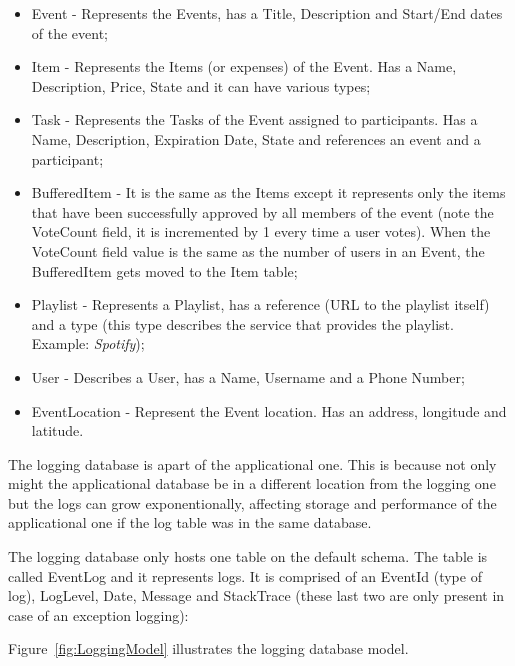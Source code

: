 \begin{itemize}
	\item Event - Represents the Events, has a Title, Description and Start/End dates of the event;
	
	\item Item - Represents the Items (or expenses) of the Event. Has a Name, Description, Price, State and it can have various types;
	
	\item Task - Represents the Tasks of the Event assigned to participants. Has a Name, Description, Expiration Date, State and references an event and a participant;
	
	\item BufferedItem - It is the same as the Items except it represents only the items that have been successfully approved by all members of the event (note the VoteCount field, it is incremented by 1 every time a user votes). When the VoteCount field value is the same as the number of users in an Event, the BufferedItem gets moved to the Item table;
	
	\item Playlist - Represents a Playlist, has a reference (URL to the playlist itself) and a type (this type describes the service that provides the playlist. Example: \textit{Spotify});
	
	\item User - Describes a User, has a Name, Username and a Phone Number;
	
	\item EventLocation - Represent the Event location. Has an address, longitude and latitude.
	
\end{itemize}


The logging database is apart of the applicational one. This is because not only might the applicational database be in a different location from the logging one but the logs can grow exponentionally, affecting storage and performance of the applicational one if the log table was in the same database.

The logging database only hosts one table on the default schema. The table is called EventLog and it represents logs. It is comprised of an EventId (type of log), LogLevel, Date, Message and StackTrace (these last two are only present in case of an exception logging):

Figure~\ref{fig:LoggingModel} illustrates the logging database model.

